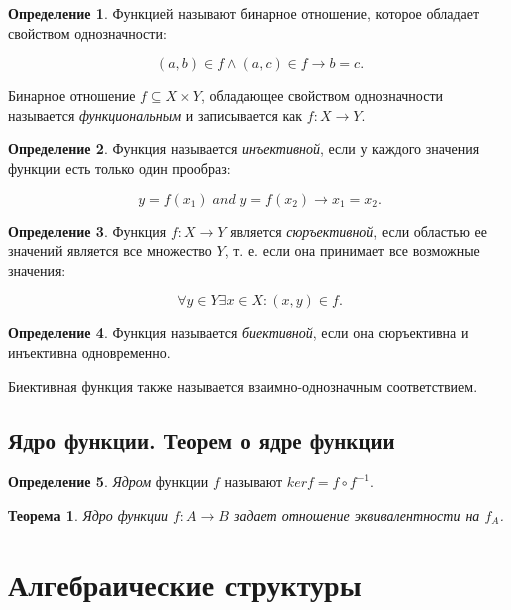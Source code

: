 \documentclass{article}
\newtheorem*{theorem*}{Теорема}
\theoremstyle{plain}
\theoremstyle{definition}
\newtheorem{definition}{Определение}[subsection]
\begin{document}
\begin{definition}
	Функцией называют бинарное отношение, которое обладает свойством однозначности:

	\[
		(a, b) \in f \land (a, c) \in f \rightarrow b = c.
	\]
\end{definition}

Бинарное отношение \(f \subseteq X \times Y\), обладающее свойством однозначности называется \textit{функциональным} и записывается как \(f \colon X \rightarrow Y\).

\begin{definition}
	Функция называется \textit{инъективной}, если у каждого значения функции есть только один прообраз:

	\[
		y = f(x_1) \;and\; y = f(x_2) \rightarrow x_1 = x_2.
	\]
\end{definition}

\begin{definition}
	Функция \(f: X \rightarrow Y\) является \textit{сюръективной}, если областью ее значений является все множество \(Y\), т. е. если она принимает все возможные значения:

	\[
		\forall y \in Y \exists x \in X \colon (x, y) \in f.
	\]
\end{definition}

\begin{definition}
	Функция называется \textit{биективной}, если она сюръективна и инъективна одновременно.
\end{definition}

Биективная функция также называется взаимно-однозначным соответствием.

\subsection{Ядро функции. Теорем о ядре функции}

\begin{definition}
	\textit{Ядром} функции \(f\) называют \(ker f = f \circ f^{-1}\).
\end{definition}

\begin{theorem*}
	Ядро функции \(f \colon A \rightarrow B\) задает отношение эквивалентности на \(f_A\).
\end{theorem*}

\section{Алгебраические структуры}
\end{document}
